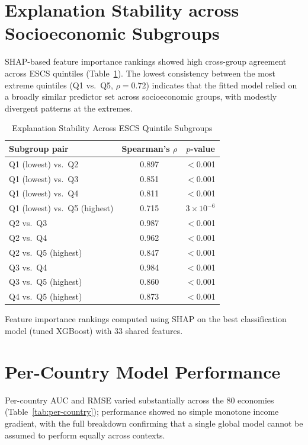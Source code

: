 \documentclass[journal]{IEEEtran}
\begin{document}
\section{Explanation Stability across Socioeconomic Subgroups}
\label{sec:s2}

SHAP-based feature importance rankings showed high cross-group agreement across ESCS quintiles (Table~\ref{tab:supp-stability}). The lowest consistency between the most extreme quintiles (Q1 vs.\ Q5, $\rho = 0.72$) indicates that the fitted model relied on a broadly similar predictor set across socioeconomic groups, with modestly divergent patterns at the extremes.

\begin{table}[!t]
\centering
\caption{Explanation Stability Across ESCS Quintile Subgroups}
\label{tab:supp-stability}
\footnotesize
\begin{tabular}{lcc}
\toprule
Subgroup pair & Spearman's $\rho$ & $p$-value \\
\midrule
Q1 (lowest) vs.\ Q2 & 0.897 & $<$0.001 \\
Q1 (lowest) vs.\ Q3 & 0.851 & $<$0.001 \\
Q1 (lowest) vs.\ Q4 & 0.811 & $<$0.001 \\
Q1 (lowest) vs.\ Q5 (highest) & 0.715 & $3\times10^{-6}$ \\
Q2 vs.\ Q3 & 0.987 & $<$0.001 \\
Q2 vs.\ Q4 & 0.962 & $<$0.001 \\
Q2 vs.\ Q5 (highest) & 0.847 & $<$0.001 \\
Q3 vs.\ Q4 & 0.984 & $<$0.001 \\
Q3 vs.\ Q5 (highest) & 0.860 & $<$0.001 \\
Q4 vs.\ Q5 (highest) & 0.873 & $<$0.001 \\
\bottomrule
\end{tabular}
\vspace{2pt}
{\footnotesize Feature importance rankings computed using SHAP on the best classification model (tuned XGBoost) with 33 shared features.}
\end{table}

\section{Per-Country Model Performance}
\label{sec:s3}

Per-country AUC and RMSE varied substantially across the 80 economies (Table~\ref{tab:per-country}); performance showed no simple monotone income gradient, with the full breakdown confirming that a single global model cannot be assumed to perform equally across contexts.
\end{document}
